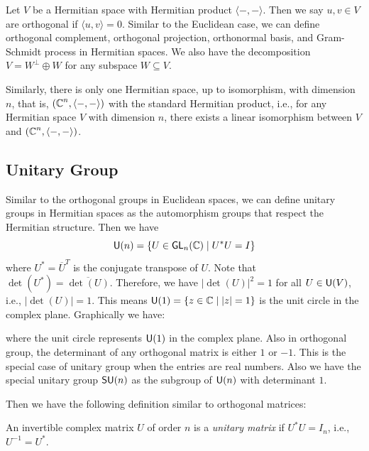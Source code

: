 Let $V$ be a Hermitian space with Hermitian product $\langle -, - \rangle$. Then we say $u, v \in V$ are orthogonal if $\langle u, v \rangle = 0$. Similar to the Euclidean case, we can define orthogonal complement, orthogonal projection, orthonormal basis, and Gram-Schmidt process in Hermitian spaces. We also have the decomposition $V = W^\perp \oplus W$ for any subspace $W \subseteq V$.

Similarly, there is only one Hermitian space, up to isomorphism, with dimension $n$, that is, $(\operatorname{\mathbb{C}}^n, \langle -, - \rangle)$ with the standard Hermitian product, i.e., for any Hermitian space $V$ with dimension $n$, there exists a linear isomorphism between $V$ and $(\operatorname{\mathbb{C}}^n, \langle -, - \rangle)$.

\subsection{Unitary Group}
Similar to the orthogonal groups in Euclidean spaces, we can define unitary groups in Hermitian spaces as the automorphism groups that respect the Hermitian structure. Then we have
\[
	\operatorname{\text{\normalfont\sffamily U}}(n) = \{ U \in \operatorname{\text{\normalfont\sffamily GL}}_n(\operatorname{\mathbb{C}}) \mid U^* U = I \}
\]
where $U^* = \overline{U}^T$ is the conjugate transpose of $U$. Note that $\det(U^*) = \overline{\det(U)}$. Therefore, we have $|\det(U)|^2 = 1$ for all $U \in \operatorname{\text{\normalfont\sffamily U}}(V)$, i.e., $|\det(U)| = 1$. This means $\operatorname{\text{\normalfont\sffamily U}}(1) = \{ z \in \operatorname{\mathbb{C}} \mid |z| = 1 \}$ is the unit circle in the complex plane. Graphically we have:
\begin{center}
\end{center}
where the unit circle represents $\operatorname{\text{\normalfont\sffamily U}}(1)$ in the complex plane. Also in orthogonal group, the determinant of any orthogonal matrix is either $1$ or $-1$. This is the special case of unitary group when the entries are real numbers. Also we have the special unitary group $\operatorname{\text{\normalfont\sffamily SU}}(n)$ as the subgroup of $\operatorname{\text{\normalfont\sffamily U}}(n)$ with determinant $1$.

Then we have the following definition similar to orthogonal matrices:
\begin{definition}\label{def:unitary_matrix}
	An invertible complex matrix $U$ of order $n$ is a \emph{unitary matrix} if $U^* U = I_n$, i.e., $U^{-1} = U^*$.
\end{definition}


